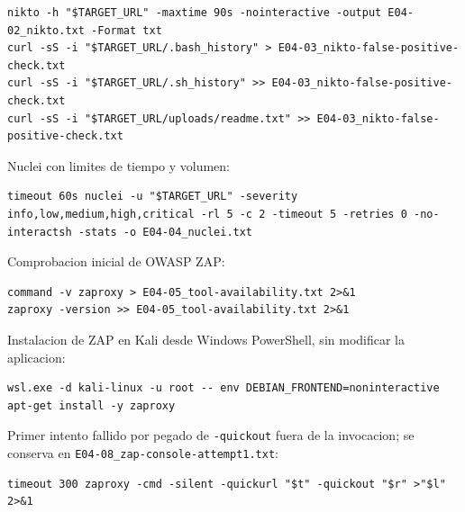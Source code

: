\begin{tcolorbox}[codebox]
\begin{Verbatim}[fontsize=\scriptsize,breaklines=true,breakanywhere=true]
nikto -h "$TARGET_URL" -maxtime 90s -nointeractive -output E04-02_nikto.txt -Format txt
curl -sS -i "$TARGET_URL/.bash_history" > E04-03_nikto-false-positive-check.txt
curl -sS -i "$TARGET_URL/.sh_history" >> E04-03_nikto-false-positive-check.txt
curl -sS -i "$TARGET_URL/uploads/readme.txt" >> E04-03_nikto-false-positive-check.txt
\end{Verbatim}
\end{tcolorbox}

Nuclei con limites de tiempo y volumen:

\begin{tcolorbox}[codebox]
\begin{Verbatim}[fontsize=\scriptsize,breaklines=true,breakanywhere=true]
timeout 60s nuclei -u "$TARGET_URL" -severity info,low,medium,high,critical -rl 5 -c 2 -timeout 5 -retries 0 -no-interactsh -stats -o E04-04_nuclei.txt
\end{Verbatim}
\end{tcolorbox}

Comprobacion inicial de OWASP ZAP:

\begin{tcolorbox}[codebox]
\begin{Verbatim}[fontsize=\scriptsize,breaklines=true,breakanywhere=true]
command -v zaproxy > E04-05_tool-availability.txt 2>&1
zaproxy -version >> E04-05_tool-availability.txt 2>&1
\end{Verbatim}
\end{tcolorbox}

Instalacion de ZAP en Kali desde Windows PowerShell, sin modificar la aplicacion:

\begin{tcolorbox}[codebox]
\begin{Verbatim}[fontsize=\scriptsize,breaklines=true,breakanywhere=true]
wsl.exe -d kali-linux -u root -- env DEBIAN_FRONTEND=noninteractive apt-get install -y zaproxy
\end{Verbatim}
\end{tcolorbox}

Primer intento fallido por pegado de \texttt{-quickout} fuera de la invocacion; se conserva en \texttt{E04-08\_zap-console-attempt1.txt}:

\begin{tcolorbox}[codebox]
\begin{Verbatim}[fontsize=\scriptsize,breaklines=true,breakanywhere=true]
timeout 300 zaproxy -cmd -silent -quickurl "$t" -quickout "$r" >"$l" 2>&1
\end{Verbatim}
\end{tcolorbox}

